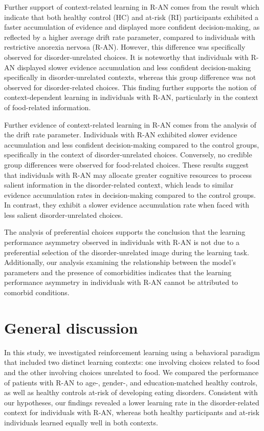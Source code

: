 \documentclass[
  man,floatsintext]{apa6}
\begin{document}
Further support of context-related learning in R-AN comes from the result which indicate that both healthy control (HC) and at-risk (RI) participants exhibited a faster accumulation of evidence and displayed more confident decision-making, as reflected by a higher average drift rate parameter, compared to individuals with restrictive anorexia nervosa (R-AN). However, this difference was specifically observed for disorder-unrelated choices. It is noteworthy that individuals with R-AN displayed slower evidence accumulation and less confident decision-making specifically in disorder-unrelated contexts, whereas this group difference was not observed for disorder-related choices. This finding further supports the notion of context-dependent learning in individuals with R-AN, particularly in the context of food-related information.

Further evidence of context-related learning in R-AN comes from the analysis of the drift rate parameter. Individuals with R-AN exhibited slower evidence accumulation and less confident decision-making compared to the control groups, specifically in the context of disorder-unrelated choices. Conversely, no credible group differences were observed for food-related choices. These results suggest that individuals with R-AN may allocate greater cognitive resources to process salient information in the disorder-related context, which leads to similar evidence accumulation rates in decision-making compared to the control groups. In contrast, they exhibit a slower evidence accumulation rate when faced with less salient disorder-unrelated choices.

The analysis of preferential choices supports the conclusion that the learning performance asymmetry observed in individuals with R-AN is not due to a preferential selection of the disorder-unrelated image during the learning task. Additionally, our analysis examining the relationship between the model's parameters and the presence of comorbidities indicates that the learning performance asymmetry in individuals with R-AN cannot be attributed to comorbid conditions.

\hypertarget{general-discussion}{%
\section{General discussion}\label{general-discussion}}

In this study, we investigated reinforcement learning using a behavioral paradigm that included two distinct learning contexts: one involving choices related to food and the other involving choices unrelated to food. We compared the performance of patients with R-AN to age-, gender-, and education-matched healthy controls, as well as healthy controls at-risk of developing eating disorders. Consistent with our hypotheses, our findings revealed a lower learning rate in the disorder-related context for individuals with R-AN, whereas both healthy participants and at-risk individuals learned equally well in both contexts.
\end{document}
